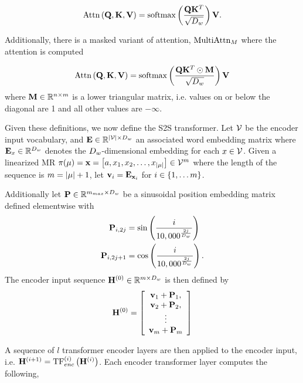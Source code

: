 \[\operatorname{Attn}\left(\mathbf{Q}, \mathbf{K}, \mathbf{V}\right) = \operatorname{softmax}\left(\frac{\mathbf{Q} \mathbf{K}^T}{\sqrt{{D_w}}} \right)\mathbf{V}. \]

Additionally, there is a masked variant of attention, $\operatorname{MultiAttn}_{M}$
where the attention is computed 

\[\operatorname{Attn}\left(\mathbf{Q}, \mathbf{K}, \mathbf{V}\right) = \operatorname{softmax}\left(\frac{\mathbf{Q} \mathbf{K}^T \odot \mathbf{M} }{\sqrt{{D_w}}} \right)\mathbf{V} \]
where $\mathbf{M} \in \mathbb{R}^{n \times m}$ 
is a lower triangular matrix, i.e. values on or below the diagonal are 1
and all other values are $-\infty$. 

Given these definitions, we now define the S2S transformer.
Let $\mathcal{V}$ be the encoder input vocabulary, and  $\mathbf{E} \in
\mathbb{R}^{{\lvert \mathcal{V} \rvert} \times {D_w}}$ an associated word embedding matrix
where $\mathbf{E}_{x} \in \mathbb{R}^{{D_w}}$ denotes the ${D_w}$-dimensional
embedding for each $x \in \mathcal{V}$. 
Given a linearized MR $\pi(\mu) = \mathbf{x}= \left[ a, x_1, x_2, \ldots,
x_{{\lvert \mu \rvert}}\right] \in \mathcal{V}^{m}$ where the length
of the sequence is $m = {\lvert \mu \rvert} + 1$,
let $\mathbf{v}_i = \mathbf{E}_{\mathbf{x}_i}$ for $i \in \{1, \ldots m\}$.

Additionally let $\mathbf{P} \in \mathbb{R}^{m_{max} \times {D_w}}$ be a sinusoidal position embedding matrix
defined elementwise with 
\begin{align*}
    \mathbf{P}_{i,2j} & = \sin\left(\frac{i}{10,000^{ \frac{2j}{{D_w}} }}\right) \\
    \mathbf{P}_{i,2j+1} & = \cos\left(\frac{i}{10,000^{ \frac{2j}{{D_w}} }}\right). 
\end{align*}
The encoder input sequence $\mathbf{H}^{(0)} \in \mathbb{R}^{m \times {D_w}}$ is then defined by
\[\mathbf{H}^{(0)} = \left[\begin{array}{c} 
            \mathbf{v}_1 + \mathbf{P}_1,\\
            \mathbf{v}_2 + \mathbf{P}_2,\\
            \vdots \\
        \mathbf{v}_m + \mathbf{P}_m
    \end{array}
                        \right] \]

 A sequence of $l$ transformer encoder layers are then applied to the encoder
 input, i.e. $\mathbf{H}^{(i+1)} = \operatorname{TF}^{(i)}_{enc}\left(\mathbf{H}^{(i)}\right)$.
Each encoder transformer layer computes the following, \\

